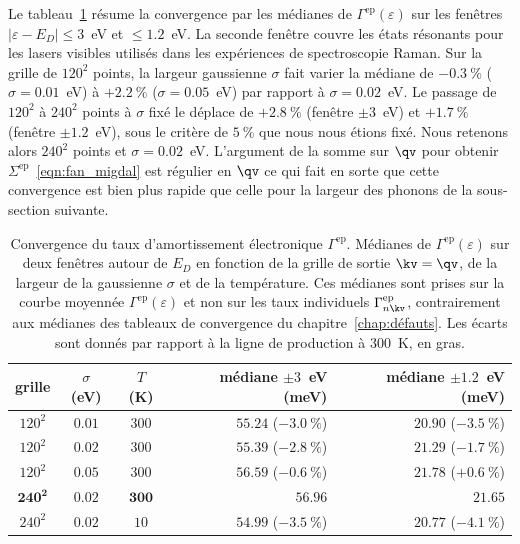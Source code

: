 Le tableau~\ref{tab:gamma_ep_conv} résume la convergence par les médianes de $\Gamma^\text{ep}(\varepsilon)$ sur les fenêtres $|\varepsilon-E_D|\leq 3$~eV et $\leq 1.2$~eV. La seconde fenêtre couvre les états résonants pour les lasers visibles utilisés dans les expériences de spectroscopie Raman. Sur la grille de $120^2$ points, la largeur gaussienne $\sigma$ fait varier la médiane de $-0.3~\%$ ($\sigma=0.01$~eV) à $+2.2~\%$ ($\sigma=0.05$~eV) par rapport à $\sigma=0.02$~eV. Le passage de $120^2$ à $240^2$ points à $\sigma$ fixé le déplace de $+2.8~\%$ (fenêtre $\pm 3$~eV) et $+1.7~\%$ (fenêtre $\pm 1.2$~eV), sous le critère de $5~\%$ que nous nous étions fixé. Nous retenons alors $240^2$ points et $\sigma=0.02$~eV. L'argument de la somme sur $\qv$ pour obtenir $\Sigma^\text{ep}$~\eqref{eqn:fan_migdal} est régulier en $\qv$ ce qui fait en sorte que cette convergence est bien plus rapide que celle pour la largeur des phonons de la sous-section suivante.
\begin{table}[htbp]
    \centering
    \caption[Convergence du taux d'amortissement électronique $\Gamma^\text{ep}$.]{Convergence du taux d'amortissement électronique $\Gamma^\text{ep}$. Médianes de $\Gamma^\text{ep}(\varepsilon)$ sur deux fenêtres autour de $E_D$ en fonction de la grille de sortie $\kv=\qv$, de la largeur de la gaussienne $\sigma$ et de la température. Ces médianes sont prises sur la courbe moyennée $\Gamma^\text{ep}(\varepsilon)$ et non sur les taux individuels $\Gamma^\text{ep}_{n\kv}$, contrairement aux médianes des tableaux de convergence du chapitre~\ref{chap:défauts}. Les écarts sont donnés par rapport à la ligne de production à $300$~K, en gras.}
    \label{tab:gamma_ep_conv}
    \begin{tabular}{cccrr}
        \hline\hline
        grille & $\sigma$ (eV) & $T$ (K) & médiane $\pm 3$~eV (meV) & médiane $\pm 1.2$~eV (meV) \\
        \hline
        $120^2$ & $0.01$ & $300$ & $55.24$ ($-3.0~\%$) & $20.90$ ($-3.5~\%$) \\
        $120^2$ & $0.02$ & $300$ & $55.39$ ($-2.8~\%$) & $21.29$ ($-1.7~\%$) \\
        $120^2$ & $0.05$ & $300$ & $56.59$ ($-0.6~\%$) & $21.78$ ($+0.6~\%$) \\
        $\mathbf{240^2}$ & $\mathbf{0.02}$ & $\mathbf{300}$ & $\mathbf{56.96}$ & $\mathbf{21.65}$ \\
        $240^2$ & $0.02$ & $10$ & $54.99$ ($-3.5~\%$) & $20.77$ ($-4.1~\%$) \\
        \hline\hline
    \end{tabular}
\end{table}
